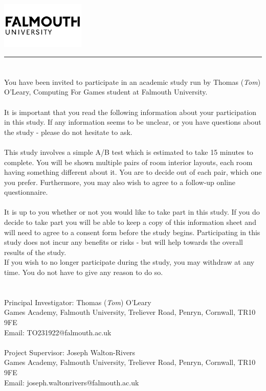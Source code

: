 \documentclass{article}
\begin{document}
\includegraphics[width=0.3\textwidth]{falmouth-university-vector-logo.png}
\vspace{-1em}

\rule{\linewidth}{1pt}
\bigskip

\section*{}
You have been invited to participate in an academic study run by Thomas (\textit{Tom}) O’Leary, Computing For Games student at Falmouth University.
\\
\\
It is important that you read the following information about your participation in this study.
If any information seems to be unclear, or you have questions about the study - please do not hesitate to ask.
\\
\\
This study involves a simple A/B test which is estimated to take 15 minutes to complete. 
You will be shown multiple pairs of room interior layouts, each room having something different 
about it. 
You are to decide out of each pair, which one you prefer. 
Furthermore, you may also wish to agree to a follow-up online questionnaire.
\\
\\
It is up to you whether or not you would like to take part in this study. 
If you do decide to take part you will be able to keep a copy of this information sheet 
and will need to agree to a consent form before the study begins.
Participating in this study does not incur any benefits or risks - but will help towards 
the overall results of the study.
\\
If you wish to no longer participate during the study, you may withdraw at any time. 
You do not have to give any reason to do so.
\bigskip

\section*{}
Principal Investigator: Thomas (\textit{Tom}) O’Leary
\\
Games Academy, Falmouth University, Treliever Road, Penryn, Cornwall, TR10 9FE
\\
Email: TO231922@falmouth.ac.uk
\\
\\
Project Supervisor: Joseph Walton-Rivers
\\
Games Academy, Falmouth University, Treliever Road, Penryn, Cornwall, TR10 9FE
\\
Email: joseph.waltonrivers@falmouth.ac.uk
\end{document}
